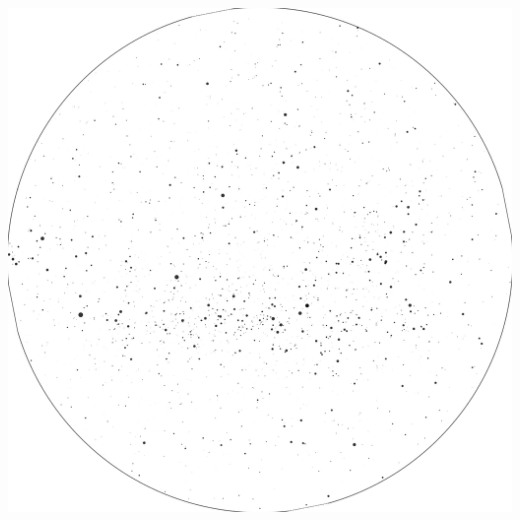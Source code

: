\documentclass{./SAS-class-skygen}
\begin{document}
	\vspace{0.5cm}
    \begin{center}
    \includegraphics[width=\textwidth]{./pics/skychart45.png}
    \end{center}
    
    
\end{document}

